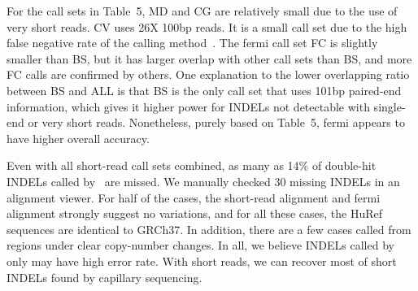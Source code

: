 \documentclass{bioinfo}
\begin{document}
For the call sets in Table~5, MD and CG are relatively small due to the use of
very short reads. CV uses 26X 100bp reads. It is a small call set due to the
high false negative rate of the calling method~\citep{Iqbal:2012ys}. The fermi
call set FC is slightly smaller than BS, but it has larger overlap with other
call sets than BS, and more FC calls are confirmed by others. One explanation
to the lower overlapping ratio between BS and ALL is that BS is the only call
set that uses 101bp paired-end information, which gives it higher power for
INDELs not detectable with single-end or very short reads.  Nonetheless, purely
based on Table~5, fermi appears to have higher overall accuracy.


Even with all short-read call sets combined, as many as 14\% of double-hit
INDELs called by~\citet{Mills:2011fk} are missed. We manually checked 30
missing INDELs in an alignment viewer. For half of the cases, the short-read
alignment and fermi alignment strongly suggest no variations, and for all these
cases, the HuRef sequences are identical to GRCh37. In addition, there are a few
cases called from regions under clear copy-number changes. In all, we believe
INDELs called by~\citet{Mills:2011fk} only may have high error rate. With
short reads, we can recover most of short INDELs found by capillary sequencing.
\end{document}
